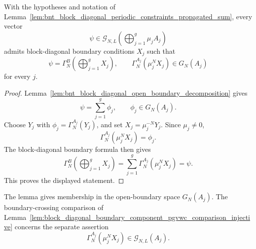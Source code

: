\begin{lemma}
    \label{lem:bnt_block_diagonal_open_boundary_matrices}
    \leanok
    With the hypotheses and notation of
    Lemma~\ref{lem:bnt_block_diagonal_periodic_constraints_propagated_sum}, every
    vector
    \[
        \psi\in
        \mathcal G_{N,L}\!\left(\bigoplus_{j=1}^g\mu_jA_j\right)
    \]
    admits block-diagonal boundary conditions \(X_j\) such that
    \[
        \psi=\Gamma_N^B\!\left(\bigoplus_{j=1}^gX_j\right),
        \qquad
        \Gamma_N^{A_j}(\mu_j^NX_j)\in G_N(A_j)
    \]
    for every \(j\).
\end{lemma}

\begin{proof}
    \leanok
    Lemma~\ref{lem:bnt_block_diagonal_open_boundary_decomposition} gives
    \[
        \psi=\sum_{j=1}^g\phi_j,
        \qquad
        \phi_j\in G_N(A_j).
    \]
    Choose \(Y_j\) with \(\phi_j=\Gamma_N^{A_j}(Y_j)\), and set
    \(X_j=\mu_j^{-N}Y_j\). Since \(\mu_j\ne0\),
    \[
        \Gamma_N^{A_j}(\mu_j^NX_j)=\phi_j.
    \]
    The block-diagonal boundary formula then gives
    \[
        \Gamma_N^B\!\left(\bigoplus_{j=1}^gX_j\right)
        =
        \sum_{j=1}^g \Gamma_N^{A_j}(\mu_j^NX_j)
        =
        \psi.
    \]
    This proves the displayed statement.
\end{proof}

The lemma gives membership in the open-boundary space \(G_N(A_j)\). The
boundary-crossing comparison of
Lemma~\ref{lem:block_diagonal_boundary_component_pgvwc_comparison_injective}
concerns the separate assertion
\[
    \Gamma_N^{A_j}(\mu_j^N X_j)\in\mathcal G_{N,L}(A_j).
\]
